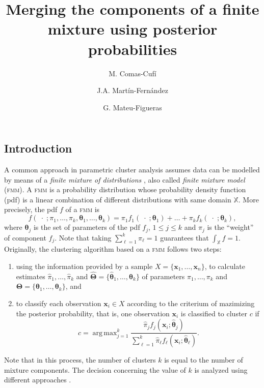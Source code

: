\documentclass[10pt, a4paper]{article}
\title{Merging the components of a finite mixture using  posterior probabilities}
\author{M. Comas-Cufí \and J.A. Martín-Fernández \and G. Mateu-Figueras}
\DeclareMathOperator*{\argmax}{arg\,max}
\newcommand{\m}[1]{\boldsymbol{#1}}
\newcommand{\fmm}{\textsc{fmm}\xspace}
\begin{document}
\begin{spacing}{1.9}



\maketitle

\section{Introduction}


A common approach in parametric cluster analysis assumes data can be modelled by means of a \emph{finite mixture of distributions} \citep{fraley2002model}, also called \emph{finite mixture model} (\fmm). A \fmm is a probability distribution whose probability density function (pdf) is a linear combination of different distributions with same domain $\mathbb{X}$. More precisely, the pdf $f$ of a \fmm is
\begin{equation}\label{mixt}
f(\;\cdot\; ; \pi_1, \dots, \pi_k, \m\theta_1, \dots, \m\theta_k) = \pi_1 f_1(\;\cdot\; ; \m\theta_1) + \dots + \pi_k f_k(\;\cdot\; ; \m\theta_k),
\end{equation}
where $\m\theta_j$ is the set of parameters of the pdf $f_j$, $1\leq j \leq k$ and $\pi_j$ is the ``weight'' of component $f_j$. Note that taking $\sum_{\ell = 1}^k \pi_\ell = 1$ guarantees that  $\int_{\mathbb{X}}f = 1$. Originally, the clustering algorithm based on a \fmm follows two steps:
\begin{enumerate}
\item using the information provided by a sample $X=\{\m x_1, \dots, \m x_n\}$, to calculate estimates $\hat{\pi}_1, \dots, \hat{\pi}_k$ and $\hat{\m\Theta}=\{\hat{\m\theta}_1, \dots, \hat{\m\theta}_k\}$ of parameters $\pi_1, \dots, \pi_k$ and $\m\Theta=\{\m\theta_1, \dots, \m\theta_k\}$, and
\item to classify each observation $\m x_i \in X$ according to the criterium of mazimizing the posterior probability, that is, one observation $\m x_i$ is classified to cluster $c$ if
\begin{equation}\label{map_criteria}
c=\argmax_{j=1}^k \frac{ \hat{\pi}_j f_j(\m x_i ; \hat{\m\theta}_j) }{\sum_{\ell=1}^k \hat{\pi}_\ell f_\ell(\m x_i ; \hat{\m\theta}_\ell) }.
\end{equation}
\end{enumerate}
Note that in this process, the number of clusters $k$ is equal to the number of mixture components. The decision concerning the value of $k$ is analyzed using different approaches \citep{mclachlan2014components}.


\end{spacing}
\end{document}
